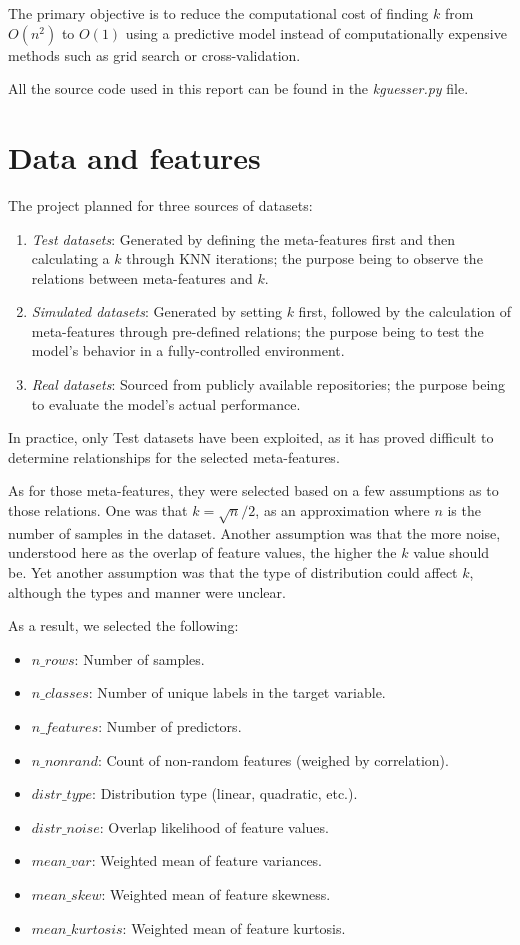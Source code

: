 \documentclass[a4paper,11pt]{article}
\begin{document}
The primary objective is to reduce the computational cost of finding \(k\) from \(O(n^2)\) to \(O(1)\) using a predictive model instead of computationally expensive methods such as grid search or cross-validation. 

All the source code used in this report can be found in the \textit{kguesser.py} file.

\section{Data and features}
The project planned for three sources of datasets:
\begin{enumerate}
    \item \textit{Test datasets}: Generated by defining the meta-features first and then calculating a \(k\) through KNN iterations; the purpose being to observe the relations between meta-features and \(k\).
    \item \textit{Simulated datasets}: Generated by setting \(k\) first, followed by the calculation of meta-features through pre-defined relations; the purpose being to test the model's behavior in a fully-controlled environment.
    \item \textit{Real datasets}: Sourced from publicly available repositories; the purpose being to evaluate the model's actual performance. 
\end{enumerate}
In practice, only Test datasets have been exploited, as it has proved difficult to determine relationships for the selected meta-features. 

As for those meta-features, they were selected based on a few assumptions as to those relations. One was that \(k = \sqrt{n}/2\), as an approximation where \(n\) is the number of samples in the dataset. Another assumption was that the more noise, understood here as the overlap of feature values, the higher the \(k\) value should be. Yet another assumption was that the type of distribution could affect \(k\), although the types and manner were unclear. 

As a result, we selected the following:
\begin{itemize}
    \item \(n\_rows\): Number of samples.
    \item \(n\_classes\): Number of unique labels in the target variable.
    \item \(n\_features\): Number of predictors.
    \item \(n\_nonrand\): Count of non-random features (weighed by correlation).
    \item \(distr\_type\): Distribution type (linear, quadratic, etc.).
    \item \(distr\_noise\): Overlap likelihood of feature values.
    \item \(mean\_var\): Weighted mean of feature variances.
    \item \(mean\_skew\): Weighted mean of feature skewness.
    \item \(mean\_kurtosis\): Weighted mean of feature kurtosis.
\end{itemize}
\end{document}
